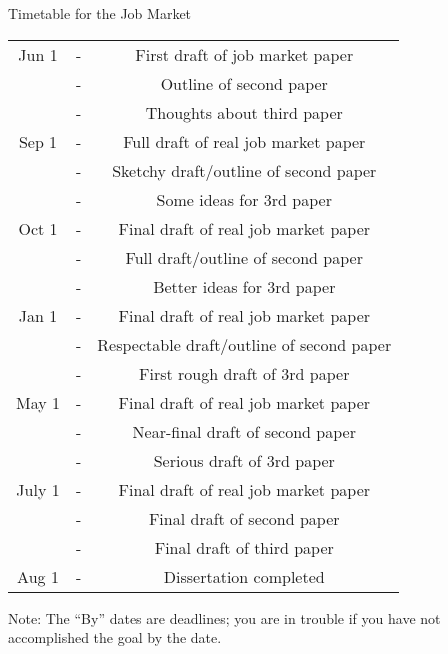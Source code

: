 \documentclass{econtex}
\begin{document}
\vfill\eject\pagebreak
\centerline{\LARGE Timetable for the Job Market}

\begin{center}
\begin{tabular}{|ccc|}\hline
     Jun 1 & - & First draft of job market paper
\\       & - & Outline of second paper
\\       & - & Thoughts about third paper
\\   Sep 1 & - & Full draft of real job market paper
\\     & - & Sketchy draft/outline of second paper
\\     & - & Some ideas for 3rd paper
\\ Oct 1 & - & Final draft of real job market paper
\\     & - & Full draft/outline of second paper
\\     & - & Better ideas for 3rd paper
\\ Jan 1 & - & Final draft of real job market paper
\\     & - & Respectable draft/outline of second paper
\\     & - & First rough draft of 3rd paper
\\ May 1 & - & Final draft of real job market paper
\\     & - & Near-final draft of second paper
\\     & - & Serious draft of 3rd paper
\\ July 1 & - & Final draft of real job market paper
\\     & - & Final draft of second paper
\\     & - & Final draft of third paper
\\ Aug 1 & - & Dissertation completed
\\ \hline 
\end{tabular}
\end{center}



Note: The ``By'' dates are deadlines; you are in trouble if you have not
accomplished the goal by the date.
\end{document}
